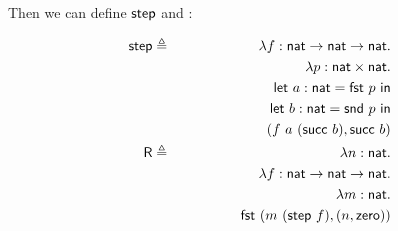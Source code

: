 \begin{enumerate}[(a)]
Then we can define $\textsf{step}$ and \R:

\begin{eqnarray*}
    \step & \definedAs & \Fn f {\nat \rightarrow \nat \rightarrow \nat} \\
          &            & \hspace{5mm} \Fn p {\nat \times \nat} \\
          &            & \hspace{1cm} \Lt a \nat {\fst~p} \\
          &            & \hspace{1cm} \Lt b \nat {\snd~p} \\
          &            & \hspace{1cm} (f~a~(\succ~b), \succ~b) \\
    \R    & \definedAs &  \Fn n \nat \\
          &            & \hspace{5mm} \Fn f {\nat \rightarrow \nat \rightarrow \nat} \\
          &            & \hspace{10mm} \Fn m \nat \\
          &            & \hspace{15mm} \fst~(m~(\step~f), (n, \zero))
\end{eqnarray*}

\end{enumerate}
